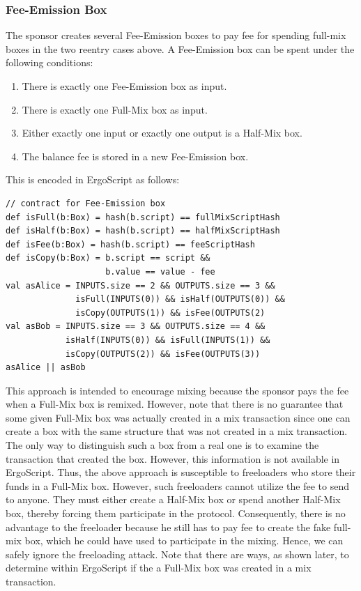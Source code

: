 \documentclass[11pt]{article}
\newcommand{\langname}{ErgoScript\xspace}
\begin{document}
\subsubsection{Fee-Emission Box}
The sponsor creates several Fee-Emission boxes to pay fee for spending full-mix boxes in the two reentry cases above. A Fee-Emission box can be spent under the following conditions:

\begin{enumerate}
    \item There is exactly one Fee-Emission box as input.
    \item There is exactly one Full-Mix box as input.
    \item Either exactly one input or exactly one output is a Half-Mix box.
    \item The balance fee is stored in a new Fee-Emission box.
\end{enumerate}

This is encoded in \langname as follows:
\begin{Verbatim}[frame=single]
// contract for Fee-Emission box
def isFull(b:Box) = hash(b.script) == fullMixScriptHash 
def isHalf(b:Box) = hash(b.script) == halfMixScriptHash
def isFee(b:Box) = hash(b.script) == feeScriptHash
def isCopy(b:Box) = b.script == script && 
                    b.value == value - fee
val asAlice = INPUTS.size == 2 && OUTPUTS.size == 3 &&
              isFull(INPUTS(0)) && isHalf(OUTPUTS(0)) &&
              isCopy(OUTPUTS(1)) && isFee(OUTPUTS(2)
val asBob = INPUTS.size == 3 && OUTPUTS.size == 4 &&
            isHalf(INPUTS(0)) && isFull(INPUTS(1)) &&
            isCopy(OUTPUTS(2)) && isFee(OUTPUTS(3))
asAlice || asBob 
\end{Verbatim}

This approach is intended to encourage mixing because the sponsor pays the fee when a Full-Mix box is remixed. However, note that there is no guarantee that some given Full-Mix box was actually created in a mix transaction since one can create a box with the same structure that was not created in a mix transaction. The only way to distinguish such a box from a real one is to examine the transaction that created the box. However, this information is not available in \langname. Thus, the above approach is susceptible to freeloaders who store their funds in a Full-Mix box. However, such freeloaders cannot utilize the fee to send to anyone. They must either create a Half-Mix box or spend another Half-Mix box, thereby forcing them participate in the protocol. Consequently, there is no advantage to the freeloader because he still has to pay fee to create the fake full-mix box, which he could have used to participate in the mixing. Hence, we can safely ignore the freeloading attack. Note that there are ways, as shown later, to determine within \langname if the a Full-Mix box was created in a mix transaction.
\end{document}
